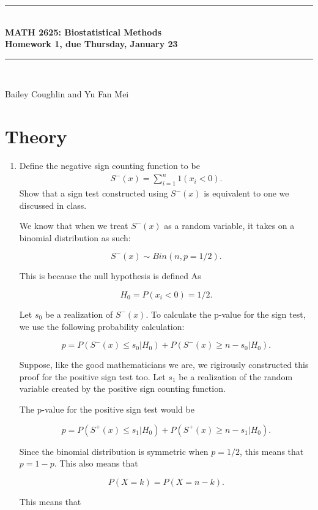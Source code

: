 \documentclass{article}
\newcommand{\HRule}{\rule{\linewidth}{0.5mm}}
\begin{document}
	\begin{center}
		\HRule \\[0.1cm]
		\vspace{0.1cm}
		{ \LARGE \bfseries MATH 2625: Biostatistical Methods\\[0.5cm] Homework 1, due Thursday, January 23 } \\[0.1cm]
		\HRule \\[0.1cm]
	\end{center}
	Bailey Coughlin and Yu Fan Mei
		
	\section*{Theory}
	\begin{enumerate}
		\item Define the negative sign counting function to be
			\begin{align*}
				S^{-}(x) = \sum_{i=1}^n 1(x_i < 0).
			\end{align*}
			Show that a sign test constructed using $S^{-}(x)$ is equivalent to one we discussed in class.

			We know that when we treat $S^-(x)$ as a random variable, it takes on a binomial distribution as such:

			$$S^-(x) \sim Bin(n, p = 1/2).$$

			This is because the null hypothesis is defined As

			$$H_0 = P(x_i < 0) = 1/2.$$

			Let $s_0$ be a realization of $S^-(x)$. To calculate the p-value for the sign test, we use the following probability calculation:

			$$p = P(S^-(x) \leq s_0 | H_0) + P(S^-(x) \geq n - s_0 | H_0).$$

			Suppose, like the good mathematicians we are, we rigirously constructed this proof for the positive sign test too. Let $s_1$ be a realization of the random variable created by the positive sign counting function.

			The p-value for the positive sign test would be

			$$p = P(S^+(x) \leq s_1 | H_0) + P(S^+(x) \geq n - s_1 | H_0).$$

			Since the binomial distribution is symmetric when $p = 1/2$, this means that $p = 1 - p$. This also means that

			$$P(X = k) = P(X = n - k).$$

			This means that


\end{enumerate}
\end{document}
